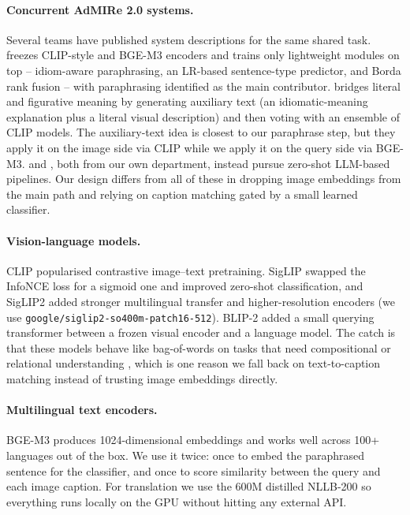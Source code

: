 \documentclass[11pt]{article}
\begin{document}
\paragraph{Concurrent AdMIRe 2.0 systems.}
Several teams have published system descriptions for the same shared task.
\citet{hosseinikivanani2026polyframe} freezes CLIP-style and BGE-M3 encoders
and trains only lightweight modules on top -- idiom-aware paraphrasing, an
LR-based sentence-type predictor, and Borda rank fusion -- with paraphrasing
identified as the main contributor. \citet{cotiga2026dcsn} bridges literal
and figurative meaning by generating auxiliary text (an idiomatic-meaning
explanation plus a literal visual description) and then voting with an
ensemble of CLIP models. The auxiliary-text idea is closest to our paraphrase
step, but they apply it on the image side via CLIP while we apply it on the
query side via BGE-M3. \citet{site2026itunlp} and \citet{umut2026itunlp2},
both from our own department, instead pursue zero-shot LLM-based pipelines.
Our design differs from all of these in dropping image embeddings from the
main path and relying on caption matching gated by a small learned
classifier.

\paragraph{Vision-language models.}
CLIP \cite{radford2021clip} popularised contrastive image--text pretraining.
SigLIP \cite{zhai2023siglip} swapped the InfoNCE loss for a sigmoid one and
improved zero-shot classification, and SigLIP2 \cite{siglip2_2025} added
stronger multilingual transfer and higher-resolution encoders (we use
\texttt{google/siglip2-so400m-patch16-512}). BLIP-2 \cite{li2023blip2} added a
small querying transformer between a frozen visual encoder and a language
model. The catch is that these models behave like bag-of-words on tasks that
need compositional or relational understanding
\cite{yuksekgonul2023aro,thrush2022winoground}, which is one reason we
fall back on text-to-caption matching instead of trusting image embeddings
directly.

\paragraph{Multilingual text encoders.}
BGE-M3 \cite{chen2024bge} produces 1024-dimensional embeddings and works well
across 100+ languages out of the box. We use it twice: once to embed the
paraphrased sentence for the classifier, and once to score similarity between
the query and each image caption. For translation we use the 600M distilled
NLLB-200 \cite{nllb2022} so everything runs locally on the GPU without hitting
any external API.
\end{document}
